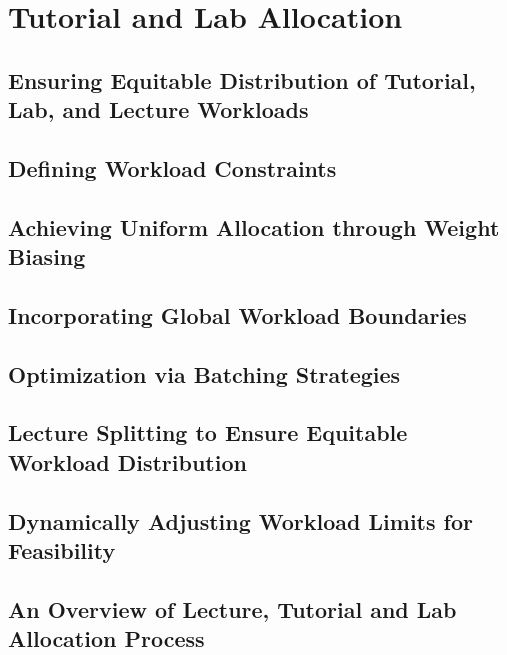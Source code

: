 \chapter{Tutorial and Lab Allocation}

\section{Ensuring Equitable Distribution of Tutorial, Lab, and Lecture Workloads}
\section{Defining Workload Constraints}
\section{Achieving Uniform Allocation through Weight Biasing}
\section{Incorporating Global Workload Boundaries}
\section{Optimization via Batching Strategies}
\section{Lecture Splitting to Ensure Equitable Workload Distribution}
\section{Dynamically Adjusting Workload Limits for Feasibility}
\section{An Overview of Lecture, Tutorial and Lab Allocation Process}
